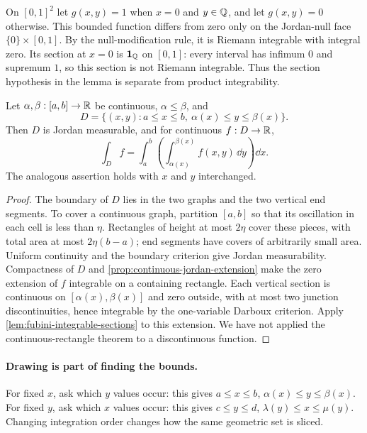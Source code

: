 \begin{example}
On $[0,1]^2$ let $g(x,y)=1$ when $x=0$ and $y\in\mathbb{Q}$, and let
$g(x,y)=0$ otherwise. This bounded function differs from zero only on
the Jordan-null face $\{0\}\times[0,1]$. By the null-modification
rule, it is Riemann integrable with integral zero. Its section at $x=0$
is $\mathbf1_{\mathbb{Q}}$ on $[0,1]$: every interval has infimum $0$ and
supremum $1$, so this section is not Riemann integrable. Thus the
section hypothesis in the lemma is separate from product integrability.
\end{example}

\begin{theorem}
\label{thm:simple-planar-region}
Let $\alpha,\beta:[a,b]\to\mathbb{R}$ be continuous, $\alpha\leq\beta$, and
\[
D=\{(x,y):a\leq x\leq b,\ \alpha(x)\leq y\leq\beta(x)\}.
\]
Then $D$ is Jordan measurable, and for continuous $f:D\to\mathbb{R}$,
\[
\int_D f=\int_a^b\left(\int_{\alpha(x)}^{\beta(x)}f(x,y)\,\dd y\right)\dd x.
\]
The analogous assertion holds with $x$ and $y$ interchanged.
\end{theorem}
\begin{proof}
The boundary of $D$ lies in the two graphs and the two vertical end
segments. To cover a continuous graph, partition $[a,b]$ so that its
oscillation in each cell is less than $\eta$. Rectangles of height at most
$2\eta$ cover these pieces, with total area at most $2\eta(b-a)$;
end segments have covers of arbitrarily small area. Uniform continuity
and the boundary criterion give Jordan measurability. Compactness of $D$
and \cref{prop:continuous-jordan-extension} make the zero extension of
$f$ integrable on a containing rectangle. Each vertical section is
continuous on $[\alpha(x),\beta(x)]$ and zero outside, with at most two
junction discontinuities, hence integrable by the one-variable Darboux
criterion. Apply \cref{lem:fubini-integrable-sections} to this extension.
We have not applied the continuous-rectangle theorem to a discontinuous function.
\end{proof}


\paragraph{Drawing is part of finding the bounds.}
For fixed $x$, ask which $y$ values occur: this gives
$a\leq x\leq b$, $\alpha(x)\leq y\leq\beta(x)$.
For fixed $y$, ask which $x$ values occur: this gives
$c\leq y\leq d$, $\lambda(y)\leq x\leq\mu(y)$.
Changing integration order changes how the same geometric set is sliced.

